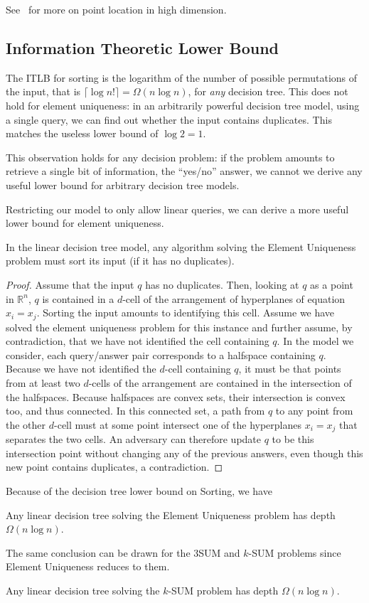 See~\cite[Section~34.6]{Sn04} for more on point location in high dimension.

\subsection{Information Theoretic Lower Bound}%
\label{sec:problem:sum:itlb}

The ITLB for sorting is the logarithm of the number of possible
permutations of the input, that is \(\lceil \log n! \rceil = \Omega(n \log
n)\), for \emph{any} decision tree. This does not hold for element uniqueness:
in an arbitrarily powerful decision tree model, using a single query, we can
find out whether the input contains duplicates. This matches the useless lower
bound of \(\log 2 = 1\).

This observation holds for any decision problem: if the problem amounts to
retrieve a single bit of information, the ``yes/no'' answer, we cannot we derive
any useful lower bound for arbitrary decision tree models.

Restricting our model to only allow linear queries,
we can derive a more useful lower bound for element uniqueness.
\begin{lemma}
	In the linear decision tree model,
	any algorithm solving the
	Element Uniqueness problem
	must
	sort its input (if it has no duplicates).
\end{lemma}
\begin{proof}
	Assume that the input \(q\) has no duplicates.
	Then, looking at \(q\) as a point in \(\mathbb{R}^n\), \(q\) is contained
	in a \(d\)-cell of the arrangement of hyperplanes of equation
	\(x_i = x_j\).
	Sorting the input amounts to identifying this cell.
	Assume we have solved the element uniqueness problem for this instance
	and further assume, by contradiction,
	that we have not identified the cell containing \(q\).
	In the model we consider, each query/answer pair corresponds to a halfspace
	containing \(q\).
	Because we have not identified the \(d\)-cell containing \(q\), it must be
	that points from at least two \(d\)-cells of the arrangement are contained
	in the intersection of the halfspaces.
	Because halfspaces are convex sets, their intersection is convex too, and
	thus connected. In this connected set, a path
	from \(q\) to any point from the other \(d\)-cell must at some point
	intersect one of the hyperplanes \(x_i = x_j\) that separates the two
	cells.
	An adversary can therefore update \(q\) to be this intersection point
	without changing any of the previous answers, even though this new point
	contains duplicates, a contradiction.
\end{proof}
%
Because of the decision tree lower bound on Sorting, we have
%
\begin{corollary}
	Any linear decision tree solving the
	Element Uniqueness problem
	has depth \(\Omega(n \log n)\).
\end{corollary}
%
The same conclusion can be drawn for the 3SUM and \(k\)-SUM problems since
Element Uniqueness reduces to them.
%
\begin{corollary}
	Any linear decision tree solving the
	\(k\)-SUM problem
	has depth \(\Omega(n \log n)\).
\end{corollary}


